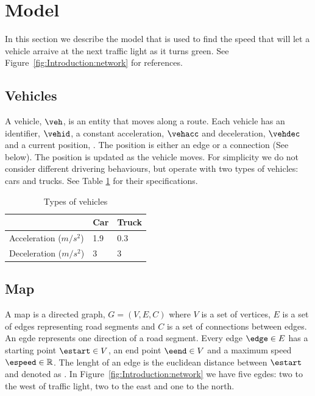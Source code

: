 \section{Model}\label{sec:Model}
In this section we describe the model that is used to find the speed that will let a vehicle arraive at the next traffic light as it turns green.
See Figure~\ref{fig:Introduction:network} for references.

\subsection{Vehicles}
A vehicle, $\veh$, is an entity that moves along a route.
Each vehicle has an identifier, $\vehid$, a constant acceleration, $\vehacc$ and deceleration, $\vehdec$ and a current position, \vehpos. 
The position is either an edge or a connection (See below).
The position is updated as the vehicle moves.
For simplicity we do not consider different drivering behaviours, but operate with two types of vehicles: cars and trucks. See Table \ref{table.vehicleTypes} for their specifications.
\begin{table}
\centering
\begin{tabular}{|l|l|l|}\hline
					& Car 	& Truck \\\hline
Acceleration ($m/s^2$)	& 1.9	& 0.3	\\\hline
Deceleration ($m/s^2$)	& 3		& 3 	\\\hline
\end{tabular}
\caption{Types of vehicles}\label{table.vehicleTypes}
\end{table}

\subsection{Map}
A map is a directed graph, $G = (V, E, C)$ where $V$ is a set of vertices, $E$ is a set of edges representing road segments and $C$ is a set of connections between edges.
An egde represents one direction of a road segment.
Every edge $\edge\in E$ has a starting point $\estart\in V$, an end point $\eend\in V$ and a maximum speed $\espeed\in\mathbb{R}$. 
The lenght of an edge is the euclidean distance between $\estart$ and \eend denoted as \elength.
In Figure~\ref{fig:Introduction:network} we have five egdes: two to the west of traffic light, two to the east and one to the north. %

